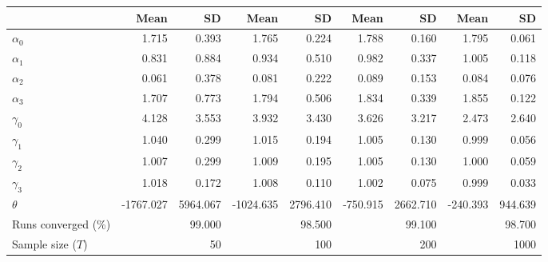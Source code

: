 
\begin{tabular}[t]{lrrrrrrrr}
\toprule
  & Mean & SD & Mean  & SD  & Mean   & SD   & Mean    & SD   \\
\midrule
$\alpha_{0}$ & 1.715 & 0.393 & 1.765 & 0.224 & 1.788 & 0.160 & 1.795 & 0.061\\
$\alpha_{1}$ & 0.831 & 0.884 & 0.934 & 0.510 & 0.982 & 0.337 & 1.005 & 0.118\\
$\alpha_{2}$ & 0.061 & 0.378 & 0.081 & 0.222 & 0.089 & 0.153 & 0.084 & 0.076\\
$\alpha_{3}$ & 1.707 & 0.773 & 1.794 & 0.506 & 1.834 & 0.339 & 1.855 & 0.122\\
$\gamma_{0}$ & 4.128 & 3.553 & 3.932 & 3.430 & 3.626 & 3.217 & 2.473 & 2.640\\
$\gamma_{1}$ & 1.040 & 0.299 & 1.015 & 0.194 & 1.005 & 0.130 & 0.999 & 0.056\\
$\gamma_{2}$ & 1.007 & 0.299 & 1.009 & 0.195 & 1.005 & 0.130 & 1.000 & 0.059\\
$\gamma_{3}$ & 1.018 & 0.172 & 1.008 & 0.110 & 1.002 & 0.075 & 0.999 & 0.033\\
$\theta$ & -1767.027 & 5964.067 & -1024.635 & 2796.410 & -750.915 & 2662.710 & -240.393 & 944.639\\
Runs converged (\%) &  & 99.000 &  & 98.500 &  & 99.100 &  & 98.700\\
Sample size ($T$) &  & 50 &  & 100 &  & 200 &  & 1000\\
\bottomrule
\end{tabular}
